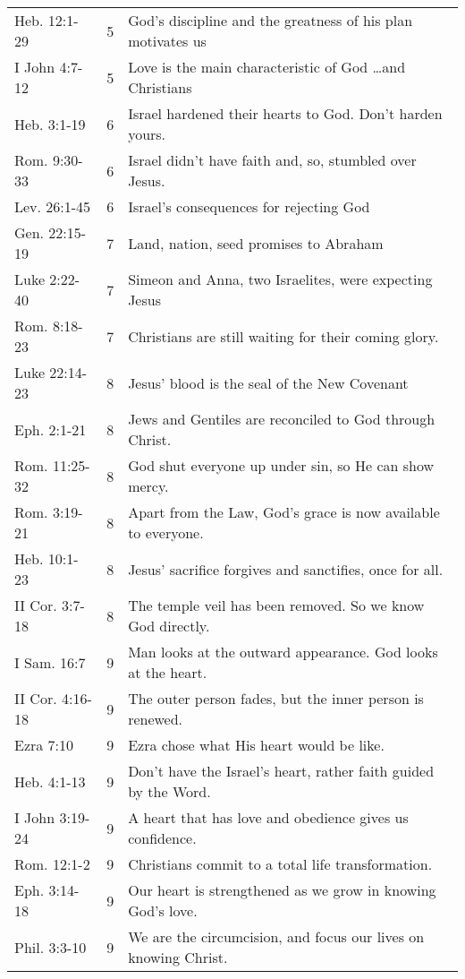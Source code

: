 \begin{table}[h]
\begin{tabular}{llp{11cm}}
Heb. 12:1-29    & 5 & God's discipline and the greatness of his plan motivates us\\
I John 4:7-12   & 5 & Love is the main characteristic of God \ldots and Christians\\
Heb. 3:1-19     & 6 & Israel hardened their hearts to God.  Don't harden yours.\\
Rom. 9:30-33    & 6 & Israel didn't have faith and, so, stumbled over Jesus.\\
Lev. 26:1-45    & 6 & Israel's consequences for rejecting God\\
Gen. 22:15-19   & 7 & Land, nation, seed promises to Abraham\\
Luke 2:22-40    & 7 & Simeon and Anna, two Israelites, were expecting Jesus\\
Rom. 8:18-23    & 7 & Christians are still waiting for their coming glory.\\
Luke 22:14-23   & 8 & Jesus' blood is the seal of the New Covenant\\
Eph. 2:1-21     & 8 & Jews and Gentiles are reconciled to God through Christ.\\
Rom. 11:25-32   & 8 & God shut everyone up under sin, so He can show mercy.\\
Rom. 3:19-21    & 8 & Apart from the Law, God's grace is now available to everyone.\\
Heb. 10:1-23    & 8 & Jesus' sacrifice forgives and sanctifies, once for all.\\
II Cor. 3:7-18  & 8 & The temple veil has been removed.  So we know God directly.\\
I Sam. 16:7     & 9 & Man looks at the outward appearance.  God looks at the heart.\\
II Cor. 4:16-18 & 9 & The outer person fades, but the inner person is renewed.\\
Ezra 7:10       & 9 & Ezra chose what His heart would be like.\\
Heb. 4:1-13     & 9 & Don't have the Israel's heart, rather faith guided by the Word.\\
I John 3:19-24  & 9 & A heart that has love and obedience gives us confidence.\\
Rom. 12:1-2     & 9 & Christians commit to a total life transformation.\\
Eph. 3:14-18    & 9 & Our heart is strengthened as we grow in knowing God's love.\\
Phil. 3:3-10    & 9 & We are the circumcision, and focus our lives on knowing Christ.\\
\bottomrule
\end{tabular}
\label{tab:ScriptureReference}
\end{table}
